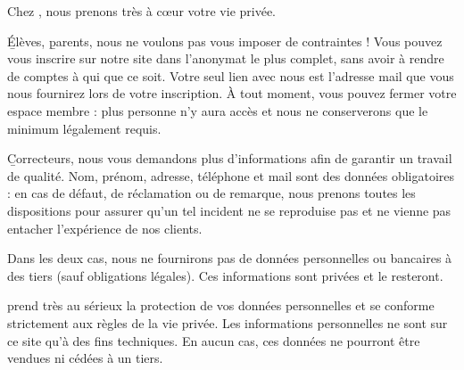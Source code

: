 Chez \eDevoir, nous prenons très à cœur votre vie privée.

\b{Élèves}, \b{parents}, nous ne voulons pas vous imposer de contraintes ! Vous pouvez vous inscrire sur notre site dans l'anonymat le plus complet, sans avoir à rendre de comptes à qui que ce soit. Votre seul lien avec nous est l'adresse mail que vous nous fournirez lors de votre inscription. À tout moment, vous pouvez fermer votre espace membre : plus personne n'y aura accès et nous ne conserverons que le minimum légalement requis.

\b{Correcteurs}, nous vous demandons plus d'informations afin de garantir un travail de qualité.  Nom, prénom, adresse, téléphone et mail sont des données obligatoires : en cas de défaut, de réclamation ou de remarque, nous prenons toutes les dispositions pour assurer qu'un tel incident ne se reproduise pas et ne vienne pas entacher l'expérience de nos clients.

Dans les deux cas, nous ne fournirons pas de données personnelles ou bancaires à des tiers (sauf obligations légales). Ces informations sont privées et le resteront.

\eDevoir prend très au sérieux la protection de vos données personnelles et se conforme strictement aux règles de la vie privée. Les informations personnelles ne sont sur ce site qu'à des fins techniques. En aucun cas, ces données ne pourront être vendues ni cédées à un tiers.

